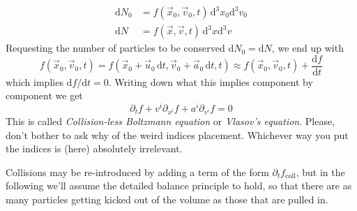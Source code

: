 \begin{align*}
    \text{d}N_{0} &= f(\vec{x}_{0}, \vec{v}_{0}, t)\,\text{d}^{3}x_{0}\text{d}^{3}v_{0}\\
    \text{d}N &= f(\vec{x}, \vec{v}, t)\,\text{d}^{3}x\text{d}^{3}v
\end{align*}
Requesting the number of particles to be conserved $\text{d}N_{0} = \text{d}N$, we end up with 
\begin{equation*}
    f(\vec{x}_{0}, \vec{v}_{0}, t) = f(\vec{x}_{0}+\vec{u}_{0}\,\text{d}t, \vec{v}_{0}+\vec{a}_{0}\,\text{d}t, t) \approx f(\vec{x}_{0}, \vec{v}_{0}, t) +\frac{\text{d}f}{\text{d}t}
\end{equation*}
which implies $\text{d}f/\text{d}t = 0$. Writing down what this implies component by component we get 
\begin{equation}
    \boxed{
    \partial_{t}f + v^{i}\partial_{x^{i}}f+a^{i}\partial_{v^{i}}f = 0
    }
    \label{eq:vlasov}
\end{equation}
This is called \emph{Collision-less Boltzmann equation} or \emph{Vlasov's equation}. Please, don't bother to ask why of the weird indices placement. Whichever way you put the indices is (here) absolutely irrelevant. 
\par Collisions may be re-introduced by adding a term of the form $\partial_{t}f_{\text{coll}}$, but in the following we'll assume the detailed balance principle to hold, so that there are as many particles getting kicked out of the volume as those that are pulled in.
